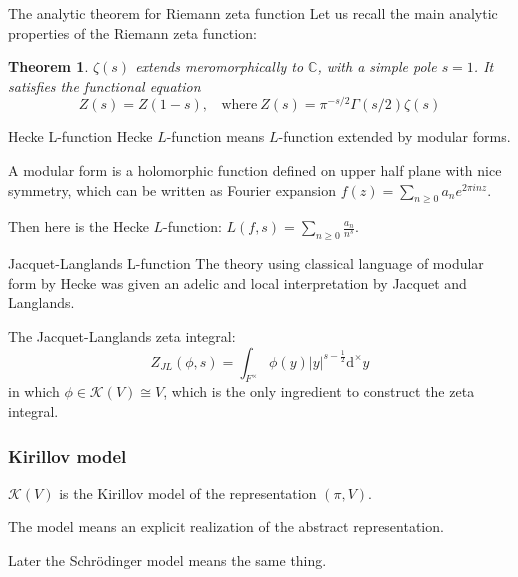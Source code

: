 \documentclass[aspectratio=169]{beamer}
\theoremstyle{plain}
\newtheorem{thm}{Theorem}[section]
\theoremstyle{definition}
\theoremstyle{remark}
\newcommand{\dif}{\text{d}}
\begin{document}
\begin{frame}{The analytic theorem for Riemann zeta function}
    Let us recall the main analytic properties of the Riemann zeta function:
  
   \begin{thm}
   $\zeta(s)$ extends meromorphically to $\mathbb{C}$, with a simple pole $s=1$. It satisfies the functional equation 
   \begin{equation*}
       Z(s)=Z(1-s),\ \ \ \ \text{where}\  Z(s)=\pi^{-s/2}\Gamma(s/2)\zeta(s)
   \end{equation*}
   \end{thm}

\end{frame}
\begin{frame}{Hecke L-function}
    Hecke $L$-function means $L$-function extended by modular forms.
    
    \vspace{0.5 cm}
    
    A modular form is a holomorphic function defined on upper half plane with nice symmetry, which can be written as Fourier expansion $f(z)=\sum_{n \geq 0}a_{n}e^{2\pi inz}$. 
    
    \vspace{0.5 cm}
    
    Then here is the Hecke $L$-function: $L(f,s)= \sum_{n\geq 0}\frac{a_{n}}{n^{s}}$.
\end{frame}
\begin{frame}{Jacquet-Langlands L-function}
    The theory using classical language of modular form by Hecke was given an adelic and local interpretation by Jacquet and Langlands.
    
    \vspace{0.5 cm}
    
    The Jacquet-Langlands zeta integral:
    \begin{equation*}
        Z_{JL}(\phi,s)=\int_{ F^{\times}}\phi(y)|y|^{s-\frac{1}{2}}\dif^{\times}y 
    \end{equation*}
    in which $\phi\in \mathcal{K}(V)\cong V$, which is the only ingredient to construct the zeta integral.
\end{frame}
\begin{frame}
\frametitle{Kirillov model}
$\mathcal{K}(V)$ is the Kirillov model of the representation $(\pi,  V)$. 

\vspace{0.5 cm}

The model means an explicit realization of the abstract representation.

\vspace{0.5 cm}

Later the Schr\"odinger model means the same thing.
\end{frame}
\end{document}
